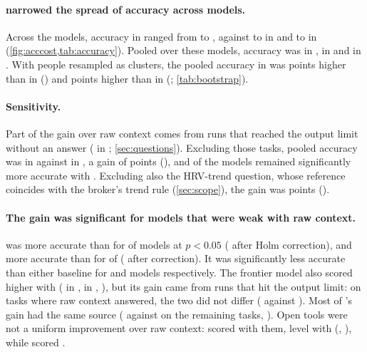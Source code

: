 \paragraph{\sys{} narrowed the spread of accuracy across models.} Across the \nModels{} models, accuracy in \CC{}
ranged from \accCMin{} to \accCMax{}, against \accAMin{} to \accAMax{} in \CA{} and \accBMin{} to \accBMax{} in \CB{}
(\cref{fig:acccost,tab:accuracy}). Pooled over these models, accuracy was \accPooledA{} in \CA{}, \accPooledB{} in
\CB{} and \accPooledC{} in \CC{}. With people resampled as clusters, the pooled accuracy in \CC{} was
\bootPooledCAEst{} points higher than in \CA{} (\bootPooledCACI{}) and \bootPooledCBEst{} points higher than in \CB{}
(\bootPooledCBCI{}; \cref{tab:bootstrap}).

\paragraph{Sensitivity.} Part of the gain over raw context comes from runs that reached the output limit without an
answer (\capA{} in \CA{}; \cref{sec:questions}). Excluding those tasks, pooled accuracy was \sensCapAccC{} in \CC{}
against \sensCapAccA{} in \CA{}, a gain of \sensCapEst{} points (\sensCapCI{}), and \sensCapNSig{} of the \nModels{}
models remained significantly more accurate with \sys{}. Excluding also the HRV-trend question, whose reference
coincides with the broker's trend rule (\cref{sec:scope}), the gain was \sensCapHrvEst{} points (\sensCapHrvCI{}).

\paragraph{The gain was significant for models that were weak with raw context.} \CC{} was more accurate than \CA{}
for \nSigCA{} of \nTestedCA{} models at $p<0.05$ (\nHolmCA{} after Holm correction), and more accurate than \CB{} for
\nSigCB{} of \nTestedCB{} (\nHolmCB{} after correction). It was significantly less accurate than either baseline for
\nSigWorseCA{} and \nSigWorseCB{} models respectively. The frontier model  also scored higher with
\sys{} (\accGeminiA{} in \CA{}, \accGeminiC{} in \CC{}, \mcnGeminiCAP{}), but its gain came from runs that hit the
output limit: on tasks where raw context answered, the two did not differ (\sensCapGeminiWins{} against
\sensCapGeminiLosses{}). Most of 's gain had the same source (\sensCapGemmaWins{} against
\sensCapGemmaLosses{} on the remaining tasks, \sensCapGemmaP{}). Open tools were not a uniform improvement over raw
context:  scored \accGemmaB{} with them, level with \CC{} (\accGemmaC{}, \mcnGemmaCBP{}), while
 scored \accLlamaThreeB{}.

